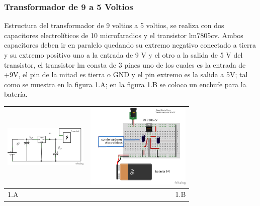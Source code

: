 \documentclass[12]{article}
\newenvironment{Figure}
{\par\medskip\noindent\minipage{\linewidth}}
{\endminipage\par\medskip}
\begin{document}
\begin{multicols}{2}
\subsubsection{Transformador de 9 a 5 Voltios}
Estructura del transformador de 9 voltios a 5 voltios, se realiza con dos capacitores electrolíticos de 10 microfaradios  y el transistor lm7805cv\cite{REGULADOR}. Ambos  capacitores deben ir en paralelo quedando su extremo negativo conectado a tierra y su extremo positivo uno a la entrada de 9 V y el otro a la salida de 5 V del transistor, el transistor lm consta de 3 pines uno de los cuales es la entrada de +9V, el pin de la mitad es tierra o GND y el pin extremo es la salida a 5V; tal como se muestra en la figura 1.A; en la figura 1.B se coloco un enchufe para la batería. 
\begin{Figure}
\center
\begin{tabular}{|l|r|}
\hline
\includegraphics[width=4cm, height=4cm]{img/esquematrans.png}  & \includegraphics[width=4.cm, height=4cm]{img/montajetr5V.png} \\ \hline
1.A & 1.B \\ \hline
\end{tabular}
\label{fig:g1}
\end{Figure}

\end{multicols}
\end{document}
